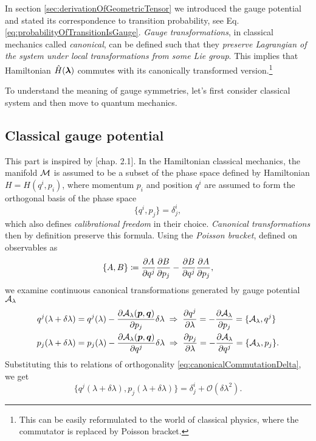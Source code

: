 In section \ref{sec:derivationOfGeometricTensor} we introduced the gauge potential and stated its correspondence to transition probability, see Eq. \ref{eq:probabilityOfTransitionIsGauge}.
\emph{Gauge transformations}, in classical mechanics called \emph{canonical}, can be defined such that they \emph{preserve Lagrangian of the system under local transformations from some Lie group}. This implies that Hamiltonian $\hat{H}({\bm\lambda})$ commutes with its canonically transformed version.\footnote{This can be easily reformulated to the world of classical physics, where the commutator is replaced by Poisson bracket.}

To understand the meaning of gauge symmetries, let's first consider classical system and then move to quantum mechanics.




\subsection{Classical gauge potential}
This part is inspired by \citet{kolodrubez}[chap. 2.1]. In the Hamiltonian classical mechanics, the manifold $\mathcal{M}$ is assumed to be a subset of the phase space defined by Hamiltonian $H=H(q^i,p_i)$, where momentum $p_i$ and position $q^i$ are assumed to form the orthogonal basis of the phase space
\begin{equation}
    \{q^i,p_j\}=\delta^i_j,
    \label{eq:canonicalCommutationDelta}
\end{equation}
which also defines \emph{calibrational freedom} in their choice. \emph{Canonical transformations} then by definition preserve this formula. Using the \emph{Poisson bracket}, defined on observables as
\begin{equation}
    \{A,B\}\coloneqq \frac{\partial A}{\partial q^j}\frac{\partial B}{\partial p_j}-\frac{\partial B}{\partial q^j}\frac{\partial A}{\partial p_j},
\end{equation}
we examine continuous canonical transformations generated by gauge potential $\mathcal{A}_\lambda$
\begin{align}
        q^j(\lambda+\delta\lambda)&=q^j(\lambda)-\frac{\partial \mathcal{A}_\lambda(\bm{p},\bm{q})}{\partial p_j}\delta\lambda \;\Rightarrow\; \frac{\partial q^j}{\partial \lambda}=-\frac{\partial \mathcal{A}_\lambda}{\partial p_j}=\{\mathcal{A}_\lambda,q^j\}
        \label{eq:gaugeAsGeneratorOfMotion1}\\
        p_j(\lambda+\delta\lambda)&=p_j(\lambda)-\frac{\partial \mathcal{A}_\lambda(\bm{p},\bm{q})}{\partial q^j}\delta\lambda \;\Rightarrow\; \frac{\partial p_j}{\partial \lambda}=-\frac{\partial \mathcal{A}_\lambda}{\partial q^j}=\{\mathcal{A}_\lambda,p_j\}.
        \label{eq:gaugeAsGeneratorOfMotion2}
\end{align}
Substituting this to relations of orthogonality \ref{eq:canonicalCommutationDelta}, we get
\begin{equation}
    \{q^j(\lambda+\delta\lambda),p_j(\lambda+\delta\lambda)\}=\delta^i_j + \mathcal{O}(\delta\lambda^2).
\end{equation}
 
